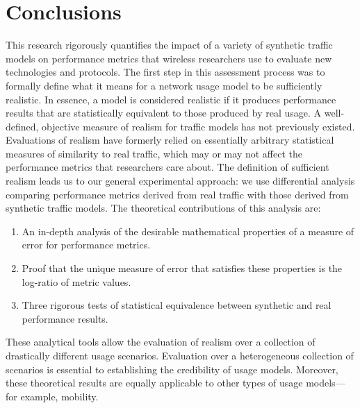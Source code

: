 \documentclass[conference]{IEEEtran}
\newcommand{\caps}[1]{{\small{#1}}}
\begin{document}
\section{Conclusions}\label{sec:conclusions}



This research rigorously quantifies the impact of a variety of synthetic traffic models on performance metrics that wireless researchers use to evaluate new technologies and protocols. The first step in this assessment process was to formally define what it means for a network usage model to be sufficiently realistic. In essence, a model is considered realistic if it produces performance results that are statistically equivalent to those produced by real usage.
A well-defined, objective measure of realism for traffic models has not previously existed. Evaluations of realism have formerly relied on essentially arbitrary statistical measures of similarity to real traffic, which may or may not affect the performance metrics that researchers care about.
The definition of sufficient realism leads us to our general experimental approach: we use differential analysis comparing performance metrics derived from real traffic with those derived from synthetic traffic models. The theoretical contributions of this analysis are:
\begin{enumerate}
\item An in-depth analysis of the desirable mathematical properties of a measure of error for performance metrics.
\item Proof that the unique measure of error that satisfies these properties is the log-ratio of metric values.
\item Three rigorous tests of statistical equivalence between synthetic and real performance results.
\end{enumerate}
These analytical tools allow the evaluation of realism over a collection of drastically different usage scenarios. Evaluation over a heterogeneous collection of scenarios is essential to establishing the credibility of usage models. Moreover, these theoretical results are equally applicable to other types of usage models---for example, mobility.
\end{document}
